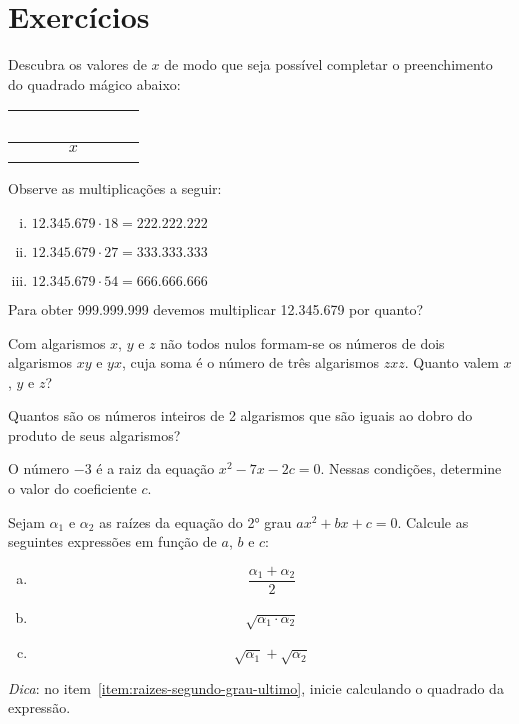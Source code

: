 \section{Exercícios}

\begin{exercise}
Descubra os valores de $x$ de modo que seja possível completar
o preenchimento do quadrado mágico abaixo:
\begin{center}
\begin{tabular}{|c|c|c|}
  \hline
   \ \ \  & \ \ \  & \ \ \  \\ \hline
          & $x$    &        \\ \hline
          &        &        \\
  \hline
\end{tabular}
\end{center}
\end{exercise}

\begin{exercise}
Observe as multiplicações a seguir:
\begin{enumerate}[i.]
  \item $12.345.679 \cdot 18 = 222.222.222$
  \item $12.345.679 \cdot 27 = 333.333.333$
  \item $12.345.679 \cdot 54 = 666.666.666$
\end{enumerate}
Para obter 999.999.999 devemos multiplicar 12.345.679 por quanto?
\end{exercise}

\begin{exercise}
Com algarismos $x$, $y$ e $z$ não todos nulos formam-se os
números de dois algarismos $xy$ e $yx$, cuja soma é o número de três
algarismos $zxz$. Quanto valem $x$, $y$ e $z$?
\end{exercise}

\begin{exercise}
Quantos são os números inteiros de 2 algarismos que são iguais
ao dobro do produto de seus algarismos?
\end{exercise}


\begin{exercise}
O número $-3$ é a raiz da equação $x^2 -7x -2c = 0$. Nessas
condições, determine o valor do coeficiente $c$.
\end{exercise}

\begin{exercise}
  Sejam $\alpha_1$ e $\alpha_2$ as raízes da equação do 2° grau $ax^2+bx+c=0$. Calcule
  as seguintes expressões em função de $a$, $b$ e $c$:
  \begin{enumerate}[(a)]
    \item \[\frac{\alpha_1+\alpha_2}{2}\]
    \item \[\sqrt{\alpha_1\cdot\alpha_2}\]
    \item \label{item:raizes-segundo-grau-ultimo} \[\sqrt{\alpha_1}+\sqrt{\alpha_2}\]
  \end{enumerate}
  \textit{Dica}: no item~\ref{item:raizes-segundo-grau-ultimo}, inicie calculando o 
  quadrado da expressão.
\end{exercise}

